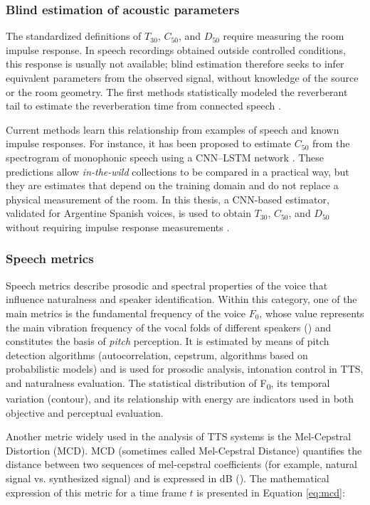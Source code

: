 \subsubsection{Blind estimation of acoustic parameters}
The standardized definitions of $T_{30}$, $C_{50}$, and $D_{50}$ require measuring the room impulse response. In speech recordings obtained outside controlled conditions, this response is usually not available; blind estimation therefore seeks to infer equivalent parameters from the observed signal, without knowledge of the source or the room geometry. The first methods statistically modeled the reverberant tail to estimate the reverberation time from connected speech \cite{ratnam2003blind}.

Current methods learn this relationship from examples of speech and known impulse responses. For instance, it has been proposed to estimate $C_{50}$ from the spectrogram of monophonic speech using a CNN--LSTM network \cite{gamper2020c50}. These predictions allow \emph{in-the-wild} collections to be compared in a practical way, but they are estimates that depend on the training domain and do not replace a physical measurement of the room. In this thesis, a CNN-based estimator, validated for Argentine Spanish voices, is used to obtain $T_{30}$, $C_{50}$, and $D_{50}$ without requiring impulse response measurements \cite{Maxi2}.


\subsubsection{Speech metrics}

Speech metrics describe prosodic and spectral properties of the voice that influence naturalness and speaker identification. Within this category, one of the main metrics is the fundamental frequency of the voice $F_0$, whose value represents the main vibration frequency of the vocal folds of different speakers (\cite{F0_desc}) and constitutes the basis of \emph{pitch} perception. It is estimated by means of pitch detection algorithms (autocorrelation, cepstrum, algorithms based on probabilistic models) and is used for prosodic analysis, intonation control in TTS, and naturalness evaluation. The statistical distribution of F\textsubscript{0}, its temporal variation (contour), and its relationship with energy are indicators used in both objective and perceptual evaluation.


Another metric widely used in the analysis of TTS systems is the Mel-Cepstral Distortion (MCD). MCD (sometimes called Mel-Cepstral Distance) quantifies the distance between two sequences of mel-cepstral coefficients (for example, natural signal vs. synthesized signal) and is expressed in dB (\cite{mcd_metric}). The mathematical expression of this metric for a time frame $t$ is presented in Equation \ref{eq:mcd}:

